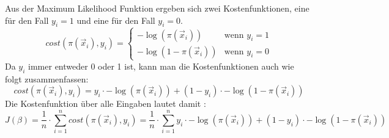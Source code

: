 Aus der Maximum Likelihood Funktion ergeben sich zwei Kostenfunktionen, eine für den Fall $y_i =1$ und eine für den Fall $y_i=0$.
\begin{displaymath}
cost(\pi(\vec x_i), y_i)= \begin{cases}
-\log(\pi(\vec x_i)) & \text{wenn } y_i=1\\
-\log(1-\pi(\vec x_i)) & \text{wenn } y_i=0
\end{cases}
\end{displaymath}
Da $y_i$ immer entweder 0 oder 1 ist, kann man die Kostenfunktionen auch wie folgt zusammenfassen:
\begin{displaymath}
cost(\pi (\vec x_i), y_i) = y_i \cdot -\log(\pi(\vec x_i)) + (1-y_i) \cdot -\log(1-\pi(\vec x_i))
\end{displaymath}
Die Kostenfunktion über alle Eingaben lautet damit \cite{HER}:
\begin{displaymath}
J(\beta)=\dfrac{1}{n} \cdot \sum_{i=1}^n cost(\pi(\vec x_i), y_i) = \dfrac{1}{n} \cdot \sum_{i=1}^n y_i \cdot -\log(\pi(\vec x_i)) + (1-y_i) \cdot -\log(1-\pi(\vec x_i))
\end{displaymath}
